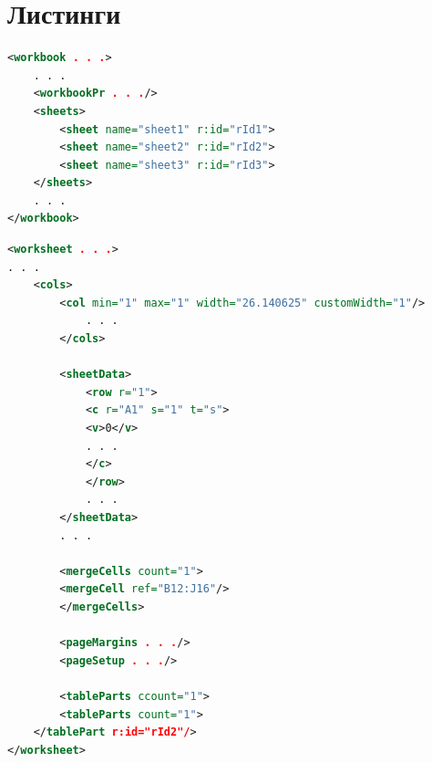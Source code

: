 \documentclass[14pt]{matmex-diploma}
\begin{document}
\section*{Листинги}
\begin{lstlisting}[language=XML, caption={Пример файла workbook.xml},captionpos=b, label=list1]
<workbook . . .>
    . . .
    <workbookPr . . ./>
    <sheets>
        <sheet name="sheet1" r:id="rId1">
        <sheet name="sheet2" r:id="rId2">
        <sheet name="sheet3" r:id="rId3">
    </sheets>
    . . .
</workbook>
\end{lstlisting}

\begin{lstlisting}[language=XML, caption={Пример файла worksheet.xml},captionpos=b, label=list2]
<worksheet . . .>
. . .
    <cols>
        <col min="1" max="1" width="26.140625" customWidth="1"/>
            . . .
        </cols>
        
        <sheetData>
            <row r="1">
            <c r="A1" s="1" t="s">
            <v>0</v>
            . . .
            </c>
            </row>
            . . .
        </sheetData>
        . . .
        
        <mergeCells count="1">
        <mergeCell ref="B12:J16"/>
        </mergeCells>
        
        <pageMargins . . ./>
        <pageSetup . . ./>
        
        <tableParts ccount="1">
        <tableParts count="1">
    </tablePart r:id="rId2"/>
</worksheet>
\end{lstlisting}

\setmonofont[Mapping=tex-text]{CMU Typewriter Text}


\end{document}
